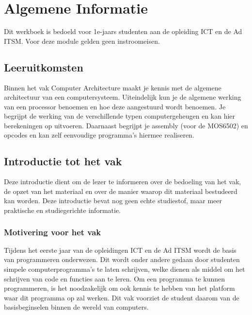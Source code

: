 \chapter{Algemene Informatie}
\label{chap:algemeneinformatie}

Dit werkboek is bedoeld voor 1e-jaars studenten aan de opleiding ICT en de Ad ITSM. Voor deze module gelden geen instroomeisen.

\section*{Leeruitkomsten}
Binnen het vak Computer Architecture maakt je kennis met de algemene architectuur van een computersysteem. Uiteindelijk kun je de algemene werking van een processor benoemen en hoe deze aangestuurd wordt benoemen. Je begrijpt de werking van de verschillende typen computergeheugen en kan hier berekeningen op uitvoeren. Daarnaast begrijpt je assembly (voor de MOS6502) en opcodes en kan zelf eenvoudige programma’s hiermee realiseren. 


\section{Introductie tot het vak}
Deze introductie dient om de lezer te informeren over de bedoeling van het vak, de opzet van het materiaal en over de manier waarop dit materiaal bestudeerd kan worden. Deze introductie bevat nog geen echte studiestof, maar meer praktische en studiegerichte informatie.

\subsection{Motivering voor het vak}
Tijdens het eerste jaar van de opleidingen ICT en de Ad ITSM wordt de basis van programmeren onderwezen. Dit wordt onder andere gedaan door studenten simpele computerprogramma’s te laten schrijven, welke dienen als middel om het schrijven van code en functies aan te leren. Om een programma te kunnen programmeren, is het noodzakelijk om ook kennis te hebben van het platform waar dit programma op zal werken. Dit vak voorziet de student daarom van de basisbeginselen binnen de wereld van computers.


